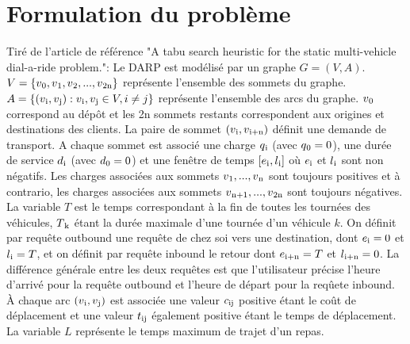\documentclass[10pt,a4paper]{report}
\begin{document}
\section*{Formulation du problème}
Tiré de l'article de référence "A tabu search heuristic for the static multi-vehicle dial-a-ride problem.": \newline
Le DARP est modélisé par un graphe $G=(V,A)$. $V=\{v\textsubscript{0},v\textsubscript{1},v\textsubscript{2},...,v\textsubscript{2n} \}$ représente l'ensemble des sommets du graphe. 
$A=\{(v\textsubscript{i},v\textsubscript{j}):v\textsubscript{i},v\textsubscript{j}\in V,i\neq j\}$ représente l'ensemble des arcs du graphe.  $v\textsubscript{0}$ correspond au dépôt et les 2n sommets restants correspondent aux origines et destinations des clients. La paire de sommet $(v\textsubscript{i},v\textsubscript{i+n})$ définit une demande de transport.  
A chaque sommet est associé une charge $q\textsubscript{i}$ (avec $q\textsubscript{0}=0$), une durée de service $d\textsubscript{i}$ (avec $d\textsubscript{0}=0$)  et une fenêtre de temps $[e\textsubscript{i},l\textsubscript{i}]$ où $e\textsubscript{i}$ et $l\textsubscript{i}$ sont non négatifs.
Les charges associées aux sommets $v\textsubscript{1},...,v\textsubscript{n}$ sont toujours positives et à contrario, les charges associées aux sommets $v\textsubscript{n+1},...,v\textsubscript{2n}$ sont toujours négatives. 
 La variable $T$ est le temps correspondant à la fin de toutes les tournées des véhicules, $T\textsubscript{k}$ étant la durée maximale d'une tournée d'un véhicule $k$. On définit par requête outbound une requête de chez soi vers une destination, dont $e\textsubscript{i}=0$ et $l\textsubscript{i}=T$, et on définit par requête inbound le retour dont $e\textsubscript{i+n}=T$ et $l\textsubscript{i+n}=0$. La différence générale entre les deux requêtes est que l'utilisateur précise l'heure d'arrivé pour la requête outbound et l'heure de départ pour la reqûete inbound.
À chaque arc $(v\textsubscript{i},v\textsubscript{j})$ est associée une valeur $c\textsubscript{ij}$ positive étant le coût de déplacement et une valeur $t\textsubscript{ij}$ également positive étant le temps de déplacement. 
La variable $L$  représente le temps maximum de trajet d'un repas.
    
\end{document}
